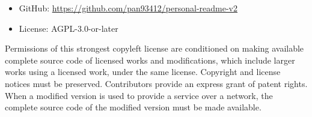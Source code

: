 \documentclass[12pt]{article}
\begin{document}
  \begin{itemize}
    \item GitHub: \url{https://github.com/pan93412/personal-readme-v2}
    \item License: AGPL-3.0-or-later
  \end{itemize}

  Permissions of this strongest copyleft license are conditioned on making available complete
  source code of licensed works and modifications, which include larger works using a licensed work,
  under the same license. Copyright and license notices must be preserved. Contributors provide an express
  grant of patent rights. When a modified version is used to provide a service over a network, the complete
  source code of the modified version must be made available.
\end{document}
